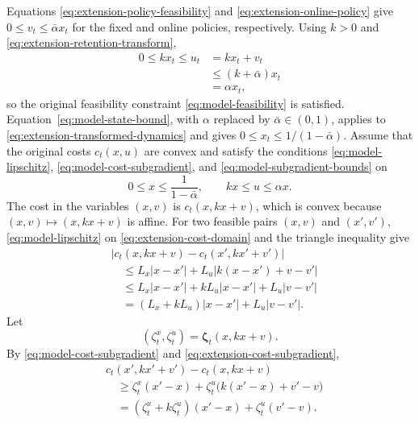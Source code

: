 \documentclass[journal]{IEEEtran}
\theoremstyle{remark}
\begin{document}
Equations \eqref{eq:extension-policy-feasibility} and
\eqref{eq:extension-online-policy} give $0\le v_t\le\bar\alpha x_t$
for the fixed and online policies, respectively.
Using $k>0$ and \eqref{eq:extension-retention-transform},
\[
\begin{aligned}
0\le kx_t\le u_t&=kx_t+v_t\\
&\le(k+\bar\alpha)x_t\\
&=\alpha x_t,
\end{aligned}
\]
so the original feasibility constraint \eqref{eq:model-feasibility} is satisfied.
Equation~\eqref{eq:model-state-bound}, with $\alpha$ replaced by
$\bar\alpha\in(0,1)$, applies to \eqref{eq:extension-transformed-dynamics}
and gives $0\le x_t\le1/(1-\bar\alpha)$.
Assume that the original costs $c_t(x,u)$ are convex and satisfy the
conditions \eqref{eq:model-lipschitz}, \eqref{eq:model-cost-subgradient},
and \eqref{eq:model-subgradient-bounds} on
\begin{equation}
\label{eq:extension-cost-domain}
0\le x\le\frac{1}{1-\bar\alpha},
\qquad
kx\le u\le\alpha x.
\end{equation}
The cost in the variables $(x,v)$ is $c_t(x,kx+v)$, which is convex because
$(x,v)\mapsto(x,kx+v)$ is affine. For two feasible pairs $(x,v)$ and $(x',v')$,
\eqref{eq:model-lipschitz} on \eqref{eq:extension-cost-domain} and the
triangle inequality give
\begin{equation}
\label{eq:extension-cost-lipschitz}
\begin{aligned}
&|c_t(x,kx+v)-c_t(x',kx'+v')|\\
&\quad\le L_x|x-x'|+L_u|k(x-x')+v-v'|\\
&\quad\le L_x|x-x'|+kL_u|x-x'|+L_u|v-v'|\\
&\quad=(L_x+kL_u)|x-x'|+L_u|v-v'|.
\end{aligned}
\end{equation}
Let
\begin{equation}
\label{eq:extension-cost-subgradient}
(\zeta_t^x,\zeta_t^u)=\boldsymbol{\zeta}_t(x,kx+v).
\end{equation}
By \eqref{eq:model-cost-subgradient} and
\eqref{eq:extension-cost-subgradient},
\begin{equation}
\label{eq:extension-subgradient-inequality}
\begin{aligned}
&c_t(x',kx'+v')-c_t(x,kx+v)\\
&\quad\ge\zeta_t^x(x'-x)+\zeta_t^u\bigl(k(x'-x)+v'-v\bigr)\\
&\quad=(\zeta_t^x+k\zeta_t^u)(x'-x)+\zeta_t^u(v'-v).
\end{aligned}
\end{equation}
\end{document}
